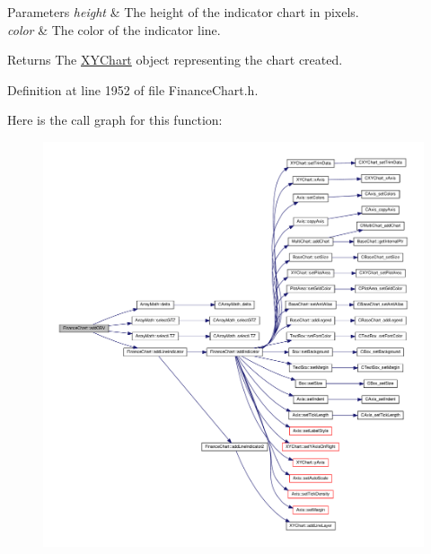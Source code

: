 \begin{DoxyParams}{Parameters}
{\em height} & The height of the indicator chart in pixels.\\
\hline
{\em color} & The color of the indicator line.\\
\hline
\end{DoxyParams}
\begin{DoxyReturn}{Returns}
The \hyperlink{class_x_y_chart}{X\+Y\+Chart} object representing the chart created.
\end{DoxyReturn}


Definition at line 1952 of file Finance\+Chart.\+h.

Here is the call graph for this function\+:
\nopagebreak
\begin{figure}[H]
\begin{center}
\leavevmode
\includegraphics[width=350pt]{class_finance_chart_a68954d093f52671623132c5fb35c261b_cgraph}
\end{center}
\end{figure}
\mbox{\label{class_finance_chart_a1f8317ff1ee6936114a408c7139e64d1}} 
